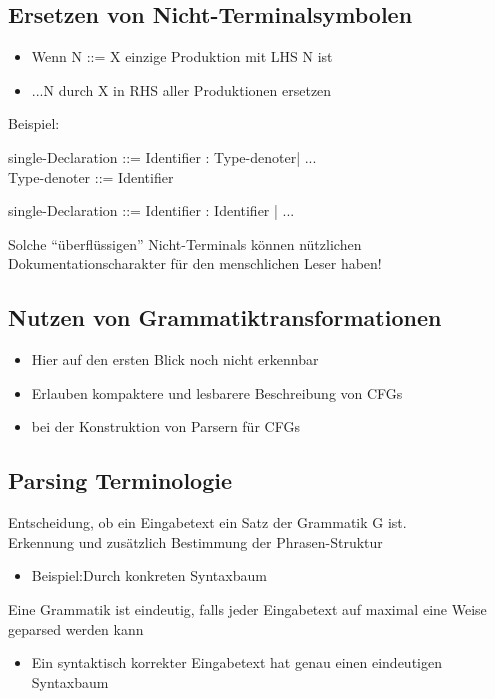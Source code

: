 \subsection{Ersetzen von Nicht-Terminalsymbolen}
\begin{itemize}
    \item Wenn N ::= X einzige Produktion mit LHS N ist
    \item ...N durch X in RHS aller Produktionen ersetzen
\end{itemize}
Beispiel:
\begin{defBox}[title=Vor Transformation]
    single-Declaration ::=  Identifier : Type-denoter| ...\\
    Type-denoter ::= Identifier
\end{defBox}
\begin{defBox}[title=Nach Ersetzung]
    single-Declaration ::=  Identifier : Identifier | ...
\end{defBox}
\begin{defBox}[title=Aber ...]
    Solche \enquote{überflüssigen} Nicht-Terminals können nützlichen Dokumentationscharakter für den menschlichen Leser haben!
\end{defBox}

\subsection{Nutzen von Grammatiktransformationen}
\begin{itemize}
    \item Hier auf den ersten Blick noch nicht erkennbar
    \item Erlauben kompaktere und lesbarere Beschreibung von CFGs
    \item {} bei der Konstruktion von Parsern für CFGs
\end{itemize}

\subsection{Parsing Terminologie}
 Entscheidung, ob ein Eingabetext ein Satz der Grammatik G ist.\\
 Erkennung und zusätzlich Bestimmung der Phrasen-Struktur
\begin{itemize}
    \item Beispiel:Durch konkreten Syntaxbaum
\end{itemize}
 Eine Grammatik ist eindeutig, falls jeder Eingabetext auf maximal eine Weise geparsed werden kann
\begin{itemize}
    \item Ein syntaktisch korrekter Eingabetext hat genau einen eindeutigen Syntaxbaum
\end{itemize}

